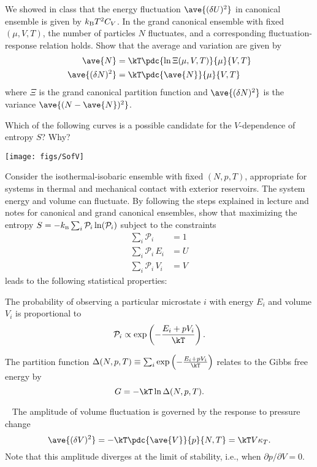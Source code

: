 We showed in class that the energy fluctuation $\ave{(\delta U)^2}$ in canonical ensemble
is given by $k_{\rm\scriptstyle B}T^2 C_V$.
In the grand canonical ensemble with fixed $(\mu,V,T)$, the number of particles $N$ fluctuates,
and a corresponding fluctuation-response relation holds.
Show that the average and variation are given by
\begin{align}
\ave{N} &= \kT \pdc{\ln\Xi(\mu,V,T)}{\mu}{V,T} \nonumber\\
\ave{(\delta N)^2} &= \kT \pdc{\ave{N}}{\mu}{V,T} \label{eq:Nfluct}
\end{align}
where $\Xi$ is the grand canonical partition function
and $\ave{(\delta N)^2}$ is the variance $\ave{(N - \ave{N})^2}$.

\bigskip
{}
Which of the following curves is a possible candidate for the
$V$-dependence of entropy $S$? Why?

\smallskip
\centerline{\texttt{[image: figs/SofV]}}

\bigskip
\bigskip
{}
Consider the isothermal-isobaric ensemble with fixed $(N,p,T)$,
appropriate for systems in thermal and mechanical contact with exterior reservoirs.
The system energy and volume can fluctuate.
By following the steps explained in lecture and notes for canonical and
grand canonical ensembles, show that maximizing the entropy
$S = -k_{\scriptscriptstyle \rm B} \sum_i \mathcal{P}_i \ln(\mathcal{P}_i)$
subject to the constraints
\begin{align*}
\sum_i \mathcal{P}_i &= 1 \\
\sum_i \mathcal{P}_i\, E_i &= U \\
\sum_i \mathcal{P}_i\, V_i &= V 
\end{align*}
leads to the following statistical properties:

\smallskip\subp
The probability of observing a particular microstate $i$ with energy $E_i$ and volume $V_i$ is proportional to
$$ \mathcal{P}_i\propto\exp\left(-\frac{E_i + p V_i}{\kT}\right) .$$

\smallskip\subp
The partition function
$\Delta (N,p,T) \equiv \sum_i \exp\left(-\frac{E_i + p V_i}{\kT}\right)$
relates to the Gibbs free energy by
$$ G = - \kT \ln \Delta(N,p,T) .$$

\vfil\eject

\ \smallskip\subp
The amplitude of volume fluctuation is governed by the response to pressure change
$$ \ave{(\delta V)^2} = -\kT \pdc{\ave{V}}{p}{N,T} = \kT V \kappa_T.$$
Note that this amplitude diverges at the limit of stability, i.e., when $\partial p/\partial{V} = 0$.

